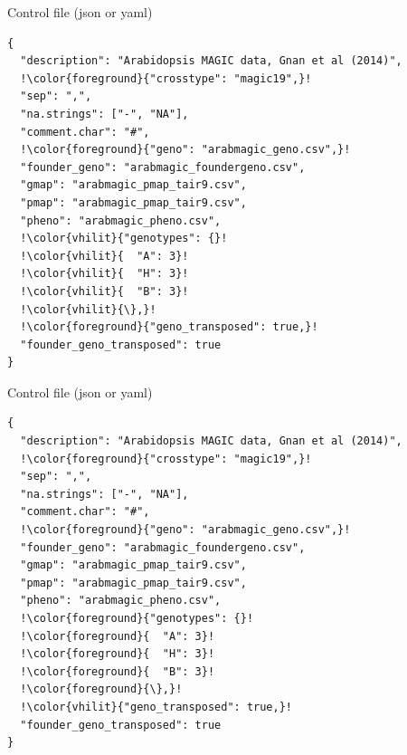 \documentclass[12pt,t,aspectratio=1610]{beamer}
\begin{document}
\begin{frame}[c,fragile]{Control file (json or yaml)}
\addtocounter{framenumber}{-1}
\begin{semiverbatim} \begin{lstlisting}[escapechar=!]
{
  "description": "Arabidopsis MAGIC data, Gnan et al (2014)",
  !\color{foreground}{"crosstype": "magic19",}!
  "sep": ",",
  "na.strings": ["-", "NA"],
  "comment.char": "#",
  !\color{foreground}{"geno": "arabmagic_geno.csv",}!
  "founder_geno": "arabmagic_foundergeno.csv",
  "gmap": "arabmagic_pmap_tair9.csv",
  "pmap": "arabmagic_pmap_tair9.csv",
  "pheno": "arabmagic_pheno.csv",
  !\color{vhilit}{"genotypes": {}!
  !\color{vhilit}{  "A": 3}!
  !\color{vhilit}{  "H": 3}!
  !\color{vhilit}{  "B": 3}!
  !\color{vhilit}{\},}!
  !\color{foreground}{"geno_transposed": true,}!
  "founder_geno_transposed": true
}
\end{lstlisting} \end{semiverbatim}
\end{frame}



\begin{frame}[c,fragile]{Control file (json or yaml)}
\addtocounter{framenumber}{-1}
\begin{semiverbatim} \begin{lstlisting}[escapechar=!]
{
  "description": "Arabidopsis MAGIC data, Gnan et al (2014)",
  !\color{foreground}{"crosstype": "magic19",}!
  "sep": ",",
  "na.strings": ["-", "NA"],
  "comment.char": "#",
  !\color{foreground}{"geno": "arabmagic_geno.csv",}!
  "founder_geno": "arabmagic_foundergeno.csv",
  "gmap": "arabmagic_pmap_tair9.csv",
  "pmap": "arabmagic_pmap_tair9.csv",
  "pheno": "arabmagic_pheno.csv",
  !\color{foreground}{"genotypes": {}!
  !\color{foreground}{  "A": 3}!
  !\color{foreground}{  "H": 3}!
  !\color{foreground}{  "B": 3}!
  !\color{foreground}{\},}!
  !\color{vhilit}{"geno_transposed": true,}!
  "founder_geno_transposed": true
}
\end{lstlisting} \end{semiverbatim}
\end{frame}
\end{document}
